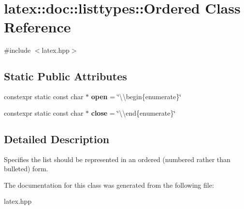 \hypertarget{classlatex_1_1doc_1_1listtypes_1_1Ordered}{\section{latex\-:\-:doc\-:\-:listtypes\-:\-:Ordered Class Reference}
\label{classlatex_1_1doc_1_1listtypes_1_1Ordered}
}


{\ttfamily \#include $<$latex.\-hpp$>$}

\subsection*{Static Public Attributes}
\begin{DoxyCompactItemize}
\item 
\hypertarget{classlatex_1_1doc_1_1listtypes_1_1Ordered_abe82c02d83ba66d14e5b0f0301aefd36}{constexpr static const char $\ast$ {\bfseries open} = \char`\"{}\textbackslash{}\textbackslash{}begin\{enumerate\}\char`\"{}}\label{classlatex_1_1doc_1_1listtypes_1_1Ordered_abe82c02d83ba66d14e5b0f0301aefd36}

\item 
\hypertarget{classlatex_1_1doc_1_1listtypes_1_1Ordered_af9bb481a3ac6257629c086fee6124384}{constexpr static const char $\ast$ {\bfseries close} = \char`\"{}\textbackslash{}\textbackslash{}end\{enumerate\}\char`\"{}}\label{classlatex_1_1doc_1_1listtypes_1_1Ordered_af9bb481a3ac6257629c086fee6124384}

\end{DoxyCompactItemize}


\subsection{Detailed Description}
Specifies the list should be represented in an ordered (numbered rather than bulleted) form. 

The documentation for this class was generated from the following file\-:\begin{DoxyCompactItemize}
\item 
latex.\-hpp\end{DoxyCompactItemize}
